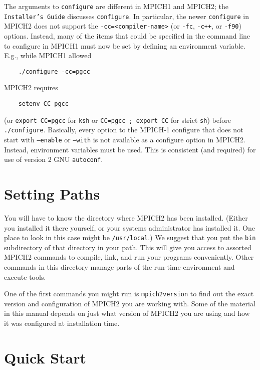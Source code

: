 \documentclass[dvipdfm,11pt]{article}
\begin{document}
The arguments to \texttt{configure} are different in MPICH1 and MPICH2;
the \texttt{Installer's Guide} discusses \texttt{configure}.  In
particular, the newer \texttt{configure} in MPICH2 does not support the
\verb+-cc=<compiler-name>+ (or \texttt{-fc}, \texttt{-c++}, or
\texttt{-f90}) options.  Instead, many of the items that could be
specified in the command line to configure in MPICH1 must now be set by
defining an environment variable.  E.g., while MPICH1 allowed
\begin{verbatim}
    ./configure -cc=pgcc
\end{verbatim}
MPICH2 requires
\begin{verbatim}
    setenv CC pgcc
\end{verbatim}
(or \verb+export CC=pgcc+ for \texttt{ksh} or \verb+CC=pgcc ; export CC+
for strict \texttt{sh}) before \texttt{./configure}.  Basically, every
option to the MPICH-1 configure that does not start with
\texttt{--enable} or \texttt{--with} is not available as a configure
option in MPICH2.  Instead, environment variables must be used.  This is
consistent (and required) for use of version 2 GNU \texttt{autoconf}.

\section{Setting Paths}
\label{sec:paths}

You will have to know the directory where MPICH2 has been installed.
(Either you installed it there yourself, or your systems administrator has
installed it.  One place to look in this case might be \texttt{/usr/local}.)
We suggest that you put the \texttt{bin} subdirectory of that directory in
your path.  This will give you access to assorted MPICH2 commands to
compile, link, and run your programs conveniently.  Other commands in
this directory manage parts of the run-time environment and execute
tools.  

One of the first commands you might run is \texttt{mpich2version} to
find out the exact version and configuration of MPICH2 you are working
with.  Some of the material in this manual depends on just what version
of MPICH2 you are using and how it was configured at installation time.


\section{Quick Start}
\label{sec:quickstart}
\end{document}
